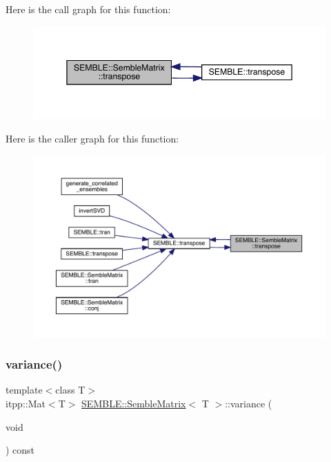 Here is the call graph for this function\+:
\nopagebreak
\begin{figure}[H]
\begin{center}
\leavevmode
\includegraphics[width=345pt]{df/d87/structSEMBLE_1_1SembleMatrix_a2013e3dd6f0dbfc71933b7e2c0a6e716_cgraph}
\end{center}
\end{figure}
Here is the caller graph for this function\+:
\nopagebreak
\begin{figure}[H]
\begin{center}
\leavevmode
\includegraphics[width=350pt]{df/d87/structSEMBLE_1_1SembleMatrix_a2013e3dd6f0dbfc71933b7e2c0a6e716_icgraph}
\end{center}
\end{figure}
\mbox{\label{structSEMBLE_1_1SembleMatrix_a00415604d082cee224aaf70367977b40}} 
\subsubsection{\texorpdfstring{variance()}{variance()}\hspace{0.1cm}{\footnotesize\ttfamily [1/2]}}
{\footnotesize\ttfamily template$<$class T$>$ \\
itpp\+::\+Mat$<$T$>$ \mbox{\hyperlink{structSEMBLE_1_1SembleMatrix}{S\+E\+M\+B\+L\+E\+::\+Semble\+Matrix}}$<$ T $>$\+::variance (\begin{DoxyParamCaption}\item[{void}]{ }\end{DoxyParamCaption}) const}

